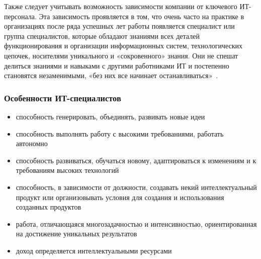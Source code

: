 \documentclass{../industrial-development}
\begin{document}
Также следует учитывать возможность зависимости компании от ключевого ИТ-персонала. Эта зависимость проявляется в том, что очень часто на практике в организациях после ряда успешных лет работы появляется специалист или группа специалистов, которые обладают знаниями всех деталей функционирования и организации информационных систем, технологических цепочек, носителями уникального и «сокровенного» знания. Они не спешат делиться знаниями и навыками с другими работниками ИТ и постепенно становятся незаменимыми, «без них все начинает останавливаться»~\cite[с.~51--52]{Tutunik}.

\begin{frame} \frametitle{Особенности ИТ-специалистов}
	
	\begin{itemize}
		\item способность генерировать, объединять, развивать новые идеи
		\item способность выполнять работу с высокими требованиями, работать автономно
		\item способность развиваться, обучаться новому, адаптироваться к изменениям и к требованиям высоких технологий
		\item способность, в зависимости от должности, создавать некий интеллектуальный продукт или организовывать условия для создания и использования созданных продуктов
		\item работа, отличающаяся многозадачностью и интенсивностью, ориентированная на достижение уникальных результатов
		\item доход определяется интеллектуальными ресурсами
		
	\end{itemize}
\end{frame}
\lecturenotes
\end{document}
